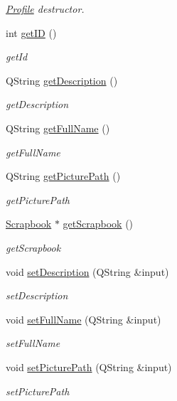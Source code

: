 \begin{DoxyCompactItemize}
\begin{DoxyCompactList}\small\item\em \hyperlink{classProfile}{Profile} destructor. \end{DoxyCompactList}\item 
int \hyperlink{classProfile_a23a7c9cb9836723d173171cef4c87063}{get\+ID} ()
\begin{DoxyCompactList}\small\item\em get\+Id \end{DoxyCompactList}\item 
Q\+String \hyperlink{classProfile_a03400292e805a44e801b5de2746efe46}{get\+Description} ()
\begin{DoxyCompactList}\small\item\em get\+Description \end{DoxyCompactList}\item 
Q\+String \hyperlink{classProfile_aad900ecefcc673a6b650682857358fa1}{get\+Full\+Name} ()
\begin{DoxyCompactList}\small\item\em get\+Full\+Name \end{DoxyCompactList}\item 
Q\+String \hyperlink{classProfile_a73ffd81d17b83e72abc3fd283fb1b54b}{get\+Picture\+Path} ()
\begin{DoxyCompactList}\small\item\em get\+Picture\+Path \end{DoxyCompactList}\item 
\hyperlink{classScrapbook}{Scrapbook} $\ast$ \hyperlink{classProfile_a6d7f9987e3ee6e9d70578d9585fa16a9}{get\+Scrapbook} ()
\begin{DoxyCompactList}\small\item\em get\+Scrapbook \end{DoxyCompactList}\item 
void \hyperlink{classProfile_a80ea407203bcbf1fd2ca229e4a1acfff}{set\+Description} (Q\+String \&input)
\begin{DoxyCompactList}\small\item\em set\+Description \end{DoxyCompactList}\item 
void \hyperlink{classProfile_ae1c5c41d66e80c65cfbd177e626a5459}{set\+Full\+Name} (Q\+String \&input)
\begin{DoxyCompactList}\small\item\em set\+Full\+Name \end{DoxyCompactList}\item 
void \hyperlink{classProfile_a02c32680f8c95d97dd88fa1098cc679d}{set\+Picture\+Path} (Q\+String \&input)
\begin{DoxyCompactList}\small\item\em set\+Picture\+Path \end{DoxyCompactList}\end{DoxyCompactItemize}


